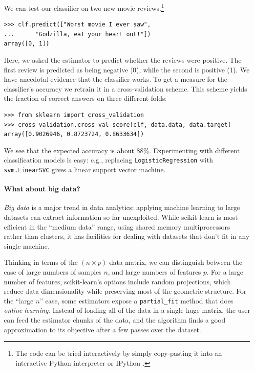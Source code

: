 \documentclass[a4paper]{article}
\begin{document}
We can test our classifier on two new movie reviews.\footnote{
  The code can be tried interactively by simply copy-pasting it
  into an interactive Python interpreter or IPython \cite{perez2007ipython}.
}
\begin{lstlisting}
>>> clf.predict(["Worst movie I ever saw",
...      "Godzilla, eat your heart out!"])
array([0, 1])
\end{lstlisting}

Here, we asked the estimator to predict whether the reviews were
positive.
The first review is predicted as being negative (0),
while the second is positive (1). We have
anecdotal evidence that the classifier works. To get a measure for the
classifier's accuracy we retrain it in a cross-validation scheme.
This scheme yields the fraction of correct answers on three different folds:
\begin{lstlisting}
>>> from sklearn import cross_validation
>>> cross_validation.cross_val_score(clf, data.data, data.target)
array([0.9026946, 0.8723724, 0.8633634])
\end{lstlisting}

We see that the expected accuracy is about 88\%.
Experimenting with different classification models is easy:
e.g., replacing \texttt{LogisticRegression} with \texttt{svm.LinearSVC}
gives a linear support vector machine.

\paragraph{What about big data?}
%
\emph{Big data} is a major trend in data analytics: applying machine
learning to large datasets can extract information so far unexploited.
While scikit-learn is most efficient in the ``medium data'' range,
using shared memory multiprocessors rather than clusters,
it has facilities for dealing with datasets that don't fit
in any single machine.

Thinking in terms of the $(n \times p)$ data matrix,
we can distinguish between the case of large numbers of samples $n$,
and large numbers of features $p$.
For a large number of features, scikit-learn's options include
random projections, which reduce data dimensionality
while preserving most of the geometric structure.
For the ``large $n$'' case, some estimators expose a \texttt{partial\_fit}
method that does \emph{online learning}.
Instead of loading all of the data in a single huge matrix, the user
can feed the estimator chunks of the data,
and the algorithm finds a good approximation to its objective
after a few passes over the dataset.
\end{document}
